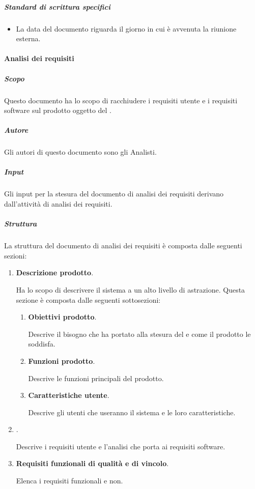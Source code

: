 \subparagraph{Standard di scrittura specifici}
\begin{itemize}
    \item La data del documento riguarda il giorno in cui è avvenuta la riunione esterna.
\end{itemize}

\paragraph{Analisi dei requisiti}

\subparagraph{Scopo}
Questo documento ha lo scopo di racchiudere i requisiti utente e i requisiti software sul prodotto oggetto del .

\subparagraph{Autore}
Gli autori di questo documento sono gli Analisti.

\subparagraph{Input}
Gli input per la stesura del documento di analisi dei requisiti derivano dall'attività di analisi dei requisiti.

\subparagraph{Struttura}
La struttura del documento di analisi dei requisiti è composta dalle seguenti sezioni:
\begin{enumerate}
    \item \textbf{Descrizione prodotto}.
    
    Ha lo scopo di descrivere il sistema a un alto livello di astrazione.
    Questa sezione è composta dalle seguenti sottosezioni:
    \begin{enumerate}
        \item \textbf{Obiettivi prodotto}.
        
        Descrive il bisogno che ha portato alla stesura del  e come il prodotto le soddisfa.
        
        \item \textbf{Funzioni prodotto}.

        Descrive le funzioni principali del prodotto.

        \item \textbf{Caratteristiche utente}.
        
        Descrive gli utenti che useranno il sistema e le loro caratteristiche.
    \end{enumerate}

    \item \textbf{}.
    
    Descrive i requisiti utente e l'analisi che porta ai requisiti software.
    
    \item \textbf{Requisiti funzionali di qualità e di vincolo}.
    
    Elenca i requisiti funzionali e non.
    
\end{enumerate}

